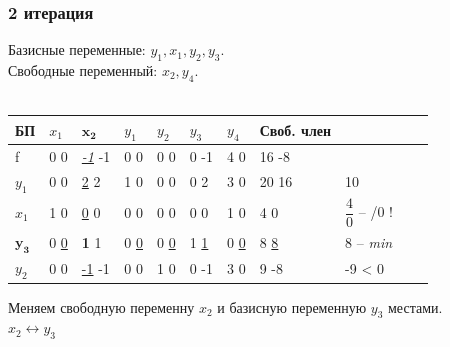\documentclass[14pt,a4paper,fleqn]{extarticle}
\begin{document}
\subsubsection*{2 итерация}
Базисные переменные: $y_1, x_1, y_2, y_3$.\\
Свободные переменный: $x_2, y_4$.\\\\
\begin{tabularx}{\textwidth}{|p{1cm}|p{1cm}V{7}p{1cm}V{6}p{1cm}|p{1cm}|p{1cm}|p{1cm}|p{1.2cm}|c}
	\hline
	БП & $x_1$ & $\boldsymbol{x_2}$ & $y_1$ & $y_2$ & $y_3$ & $y_4$ & Своб. член & \\
	\hline
	
	f & 0 \scriptsize 0 & \underline{\textit{-1}} \scriptsize -1 & 0 \scriptsize 0 & 0 \scriptsize 0 & 0 \scriptsize -1 & 4 \scriptsize 0 & 16 \scriptsize -8 & \\
	
	\hline
	
	$y_1$ & 0 \scriptsize 0 & \underline{2} \scriptsize 2 & 1 \scriptsize 0 & 0 \scriptsize 0 & 0 \scriptsize 2 & 3 \scriptsize 0 & 20 \scriptsize 16 & 10 \\
	
	\hline
	
	$x_1$ & 1 \scriptsize 0 & \underline{0} \scriptsize 0 & 0 \scriptsize 0 & 0 \scriptsize 0 & 0 \scriptsize 0 & 1 \scriptsize 0 & 4 \scriptsize 0 & $\dfrac{4}{0}$ -- /0 ! \\
	
	\Xhline{7\arrayrulewidth}
	$\boldsymbol{y_3}$ & 0 \scriptsize \underline 0 & \textbf{1} \scriptsize 1 & 0 \scriptsize \underline 0 & 0 \scriptsize \underline 0 & 1 \scriptsize \underline 1 & 0 \scriptsize \underline 0 & 8 \scriptsize \underline 8 & 8 -- \textit{min} \\
	\Xhline{6\arrayrulewidth}
	
	$y_2$ & 0 \scriptsize 0 & \underline{-1} \scriptsize -1 & 0 \scriptsize 0 & 1 \scriptsize 0 & 0 \scriptsize -1 & 3 \scriptsize 0 & 9 \scriptsize -8 & -9 < 0 \\
	\hline
\end{tabularx}
\newline\newline
Меняем свободную переменну $x_2$ и базисную переменную $y_3$ местами.\\
$x_2 \leftrightarrow y_3$
\newpage
\end{document}
